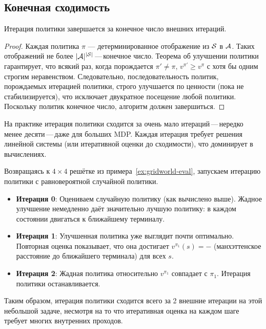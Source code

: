 \subsection*{Конечная сходимость}

\begin{theorem}
\label{thm:pi-convergence}
Итерация политики завершается за конечное число внешних итераций.
\end{theorem}

\begin{proof}
Каждая политика $\pi$ — детерминированное отображение из $\mathcal{S}$ в $\mathcal{A}$.  Таких отображений не более $|\mathcal{A}|^{|\mathcal{S}|}$\,---\,конечное число.  Теорема об улучшении политики гарантирует, что всякий раз, когда порождается $\pi' \ne \pi$, $v^{\pi'} \ge v^\pi$ с хотя бы одним строгим неравенством.  Следовательно, последовательность политик, порождаемых итерацией политики, строго улучшается по ценности (пока не стабилизируется), что исключает двукратное посещение любой политики.  Поскольку политик конечное число, алгоритм должен завершиться.
\end{proof}

\begin{remark}
На практике итерация политики сходится за очень мало итераций\,---\,нередко менее десяти\,---\,даже для больших MDP.  Каждая итерация требует решения линейной системы (или итеративной оценки до сходимости), что доминирует в вычислениях.
\end{remark}

\begin{example}
\label{ex:pi-gridworld}
Возвращаясь к $4\times4$ решётке из примера~\ref{ex:gridworld-eval}, запускаем итерацию политики с равновероятной случайной политики.

\begin{itemize}[leftmargin=*]
\item \textbf{Итерация 0}: Оцениваем случайную политику (как вычислено выше).  Жадное улучшение немедленно даёт значительно лучшую политику: в каждом состоянии двигаться к ближайшему терминалу.
\item \textbf{Итерация 1}: Улучшенная политика уже выглядит почти оптимально.  Повторная оценка показывает, что она достигает $v^{\pi_1}(s) = -$ (манхэттенское расстояние до ближайшего терминала) для всех $s$.
\item \textbf{Итерация 2}: Жадная политика относительно $v^{\pi_1}$ совпадает с $\pi_1$.  Итерация политики останавливается.
\end{itemize}
Таким образом, итерация политики сходится всего за 2 внешние итерации на этой небольшой задаче, несмотря на то что итеративная оценка на каждом шаге требует многих внутренних проходов.
\end{example}

